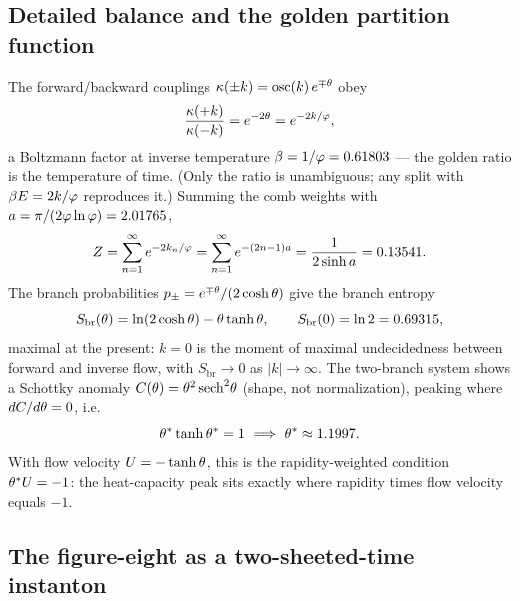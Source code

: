 \subsection{Detailed balance and the golden partition function}

The forward/backward couplings $\kappa(\pm k)=\operatorname{osc}(k)\,e^{\mp\theta}$ obey
\begin{equation}
\frac{\kappa(+k)}{\kappa(-k)}=e^{-2\theta}=e^{-2k/\varphi},
\label{eq:thermo:db}
\end{equation}
a Boltzmann factor at inverse temperature $\beta=1/\varphi=0.61803$ --- the golden ratio is the temperature of time. (Only the ratio is unambiguous; any split with $\beta E=2k/\varphi$ reproduces it.) Summing the comb weights with $a=\pi/(2\varphi\ln\varphi)=2.01765$,
\begin{equation}
Z=\sum_{n=1}^{\infty}e^{-2k_n/\varphi}=\sum_{n=1}^{\infty}e^{-(2n-1)a}=\frac{1}{2\sinh a}=0.13541 .
\label{eq:thermo:Z}
\end{equation}
The branch probabilities $p_\pm=e^{\mp\theta}/(2\cosh\theta)$ give the branch entropy
\begin{equation}
S_{\mathrm{br}}(\theta)=\ln(2\cosh\theta)-\theta\tanh\theta,\qquad S_{\mathrm{br}}(0)=\ln 2=0.69315 ,
\label{eq:thermo:Sbr}
\end{equation}
maximal at the present: $k=0$ is the moment of maximal undecidedness between forward and inverse flow, with $S_{\mathrm{br}}\to0$ as $|k|\to\infty$. The two-branch system shows a Schottky anomaly $C(\theta)=\theta^2\,\mathrm{sech}^2\theta$ (shape, not normalization), peaking where $dC/d\theta=0$, i.e.
\begin{equation}
\rap^*\tanh\rap^*=1\ \Longrightarrow\ \rap^*\approx1.1997 .
\label{eq:thermo:schottky}
\end{equation}
With flow velocity $U=-\tanh\theta$, this is the rapidity-weighted condition $\theta^*U=-1$: the heat-capacity peak sits exactly where rapidity times flow velocity equals $-1$.

\subsection{The figure-eight as a two-sheeted-time instanton}

